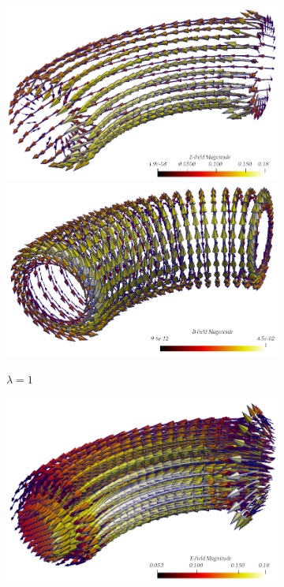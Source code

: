\documentclass{article}
\begin{document}
\begin{figure}
    \centering
    \begin{subfigure}[b]{\textwidth}
        \centering
        \includegraphics[scale=0.3]{paper_version/figures/E-field_lamnbda-1_bend.png}\hspace{1cm}
        \includegraphics[scale=0.3]{paper_version/figures/B-field_lamnbda-1_bend.png}
        \caption{\colorbox{yellow!30}{$\lambda = 1$}}
    \end{subfigure}
    \begin{subfigure}[b]{\textwidth}
        \centering
        \includegraphics[scale=0.3]{paper_version/figures/E-field_lamnbda-0_bend.png}\hspace{1cm}

\end{subfigure}
\end{figure}
\end{document}
